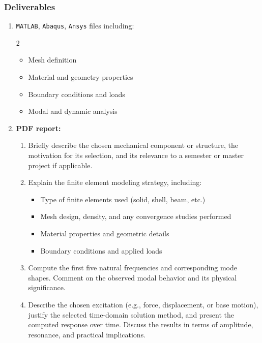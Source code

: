 \documentclass[12pt]{article}
\begin{document}
\subsubsection*{Deliverables}
\begin{enumerate}
  \item \texttt{MATLAB}, \texttt{Abaqus}, \texttt{Ansys} files including:
        \begin{multicols}{2}
          \begin{itemize}
            \item Mesh definition
            \item Material and geometry properties
            \item Boundary conditions and loads
            \item Modal and dynamic analysis
          \end{itemize}
        \end{multicols}

  \item \textbf{PDF report:}
        \begin{enumerate}[label=\alph*.]
          \item Briefly describe the chosen mechanical component or structure, the motivation for its selection, and its relevance to a semester or master project if applicable.

          \item Explain the finite element modeling strategy, including:
                \begin{itemize}
                  \item Type of finite elements used (solid, shell, beam, etc.)
                  \item Mesh design, density, and any convergence studies performed
                  \item Material properties and geometric details
                  \item Boundary conditions and applied loads
                \end{itemize}

          \item Compute  the first five natural frequencies and corresponding mode shapes. Comment on the observed modal behavior and its physical significance.

          \item Describe the chosen excitation (e.g., force, displacement, or base motion), justify the selected time-domain solution method, and present the computed response over time. Discuss the results in terms of amplitude, resonance, and practical implications.


\end{enumerate}
\end{enumerate}
\end{document}

